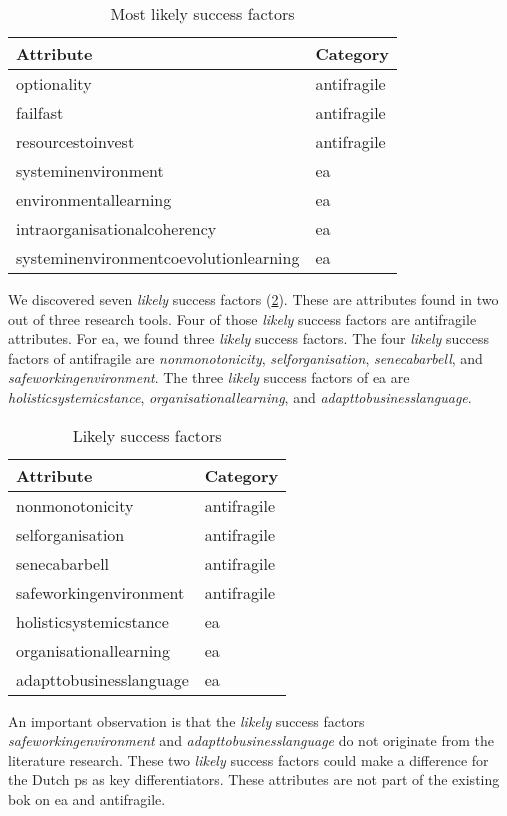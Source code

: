 \begin{table}[H]
	\centering
	\begin{tabular}{@{}ll@{}}
		\toprule
	\textbf{Attribute} & \textbf{Category} \\%
		\midrule
		\Gls{optionality} & \Gls{antifragile} \\%
		\Gls{failfast} & \Gls{antifragile} \\%
		\Gls{resourcestoinvest} & \Gls{antifragile} \\%
		\Gls{systeminenvironment} & \acrlong{ea} \\%
		\Gls{environmentallearning} & \acrlong{ea} \\%
		\Gls{intraorganisationalcoherency} & \acrlong{ea} \\%
		\Gls{systeminenvironmentcoevolutionlearning} & \acrlong{ea} \\%
		\bottomrule
	\end{tabular}%
	\caption[Most likely success factors]{Most likely success factors}
	\label{tab:identifiedsuccessfactors}%
\end{table}%
We discovered seven \textit{likely} success factors (\cref{tab:identifiedpossiblefactors}). These are \glspl{attribute} found in two out of three research tools. Four of those \textit{likely} success factors are \gls{antifragile} \glspl{attribute}. For \acrlong{ea}, we found three \textit{likely} success factors. The four \textit{likely} success factors of \gls{antifragile} are \textit{\gls{nonmonotonicity}}, \textit{\gls{selforganisation}}, \textit{\gls{senecabarbell}}, and \textit{\gls{safeworkingenvironment}}. The three \textit{likely} success factors of \acrlong{ea} are \textit{\gls{holisticsystemicstance}}, \textit{\gls{organisationallearning}}, and \textit{\gls{adapttobusinesslanguage}}.
\begin{table}[H]
	\centering
	\begin{tabular}{@{}ll@{}}
		\toprule
		\textbf{Attribute} & \textbf{Category} \\%
		\midrule
		\Gls{nonmonotonicity} & \Gls{antifragile}  \\%
		\Gls{selforganisation} & \Gls{antifragile}  \\%
		\Gls{senecabarbell} & \Gls{antifragile}  \\%
		\Gls{safeworkingenvironment} & \Gls{antifragile}  \\%
		\Gls{holisticsystemicstance} & \acrlong{ea}  \\%
		\Gls{organisationallearning} & \acrlong{ea}  \\%
		\Gls{adapttobusinesslanguage} & \acrlong{ea}  \\%
		\bottomrule
	\end{tabular}%
	\caption[Likely success factors]{Likely success factors}
	\label{tab:identifiedpossiblefactors}%
\end{table}%
An important observation is that the \textit{likely} success factors \textit{\gls{safeworkingenvironment}} and \textit{\gls{adapttobusinesslanguage}} do not originate from the literature research. These two \textit{likely} success factors could make a difference for the Dutch \gls{ps} as key differentiators. These \glspl{attribute} are not part of the existing \acrlong{bok} on \acrlong{ea} and \gls{antifragile}.


